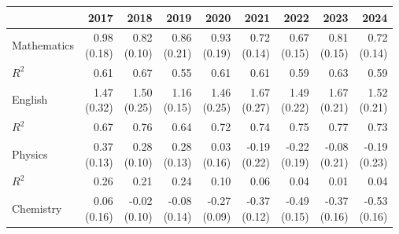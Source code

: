 \begin{tabular}{@{}lrrrrrrrr@{}}
\toprule
 & 2017 & 2018 & 2019 & 2020 & 2021 & 2022 & 2023 & 2024 \\
\midrule
Mathematics & \makecell[r]{0.98 \\ (0.18)} & \makecell[r]{0.82 \\ (0.10)} & \makecell[r]{0.86 \\ (0.21)} & \makecell[r]{0.93 \\ (0.19)} & \makecell[r]{0.72 \\ (0.14)} & \makecell[r]{0.67 \\ (0.15)} & \makecell[r]{0.81 \\ (0.15)} & \makecell[r]{0.72 \\ (0.14)} \\
\quad $R^2$ & 0.61 & 0.67 & 0.55 & 0.61 & 0.61 & 0.59 & 0.63 & 0.59 \\
English & \makecell[r]{1.47 \\ (0.32)} & \makecell[r]{1.50 \\ (0.25)} & \makecell[r]{1.16 \\ (0.15)} & \makecell[r]{1.46 \\ (0.25)} & \makecell[r]{1.67 \\ (0.27)} & \makecell[r]{1.49 \\ (0.22)} & \makecell[r]{1.67 \\ (0.21)} & \makecell[r]{1.52 \\ (0.21)} \\
\quad $R^2$ & 0.67 & 0.76 & 0.64 & 0.72 & 0.74 & 0.75 & 0.77 & 0.73 \\
Physics & \makecell[r]{0.37 \\ (0.13)} & \makecell[r]{0.28 \\ (0.10)} & \makecell[r]{0.28 \\ (0.13)} & \makecell[r]{0.03 \\ (0.16)} & \makecell[r]{-0.19 \\ (0.22)} & \makecell[r]{-0.22 \\ (0.19)} & \makecell[r]{-0.08 \\ (0.21)} & \makecell[r]{-0.19 \\ (0.23)} \\
\quad $R^2$ & 0.26 & 0.21 & 0.24 & 0.10 & 0.06 & 0.04 & 0.01 & 0.04 \\
Chemistry & \makecell[r]{0.06 \\ (0.16)} & \makecell[r]{-0.02 \\ (0.10)} & \makecell[r]{-0.08 \\ (0.14)} & \makecell[r]{-0.27 \\ (0.09)} & \makecell[r]{-0.37 \\ (0.12)} & \makecell[r]{-0.49 \\ (0.15)} & \makecell[r]{-0.37 \\ (0.16)} & \makecell[r]{-0.53 \\ (0.16)} \\

\end{tabular}
